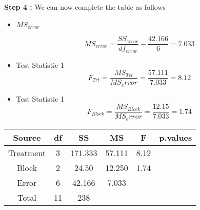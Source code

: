 \documentclass[12pt]{article}
\begin{document}
\newpage


\noindent \textbf{Step 4 :} We can now complete the table as follows
\begin{itemize}
	\item $MS_{error}$
	
	\[ MS_{error} = \frac{SS_{error}}{df_{error}} - \frac{42.166}{6} = 7.033\]
	
	\item Test Statistic 1
	\[F_{Trt} = \frac{MS_{Trt}}{ MS_error } = \frac{57.111}{7.033} = 8.12 \]
	
	\item Test Statistic 1
	\[F_{Block} = \frac{MS_{Block}}{ MS_error } = \frac{12.15}{7.033} = 1.74 \]
\end{itemize}

{
	\Large
	\begin{center}
		\begin{tabular}{|c|c|c|c|c|c|}
			\hline Source	       &	df	&	SS	&	MS	&	F	&	p.values	\\ \hline
			Treatment      &	3	&	171.333	&	57.111	&	8.12	&		\\ \hline
			Block	&	2	&	24.50	&	12.250	&	1.74	&		\\ \hline
			Error	&	6	&	42.166	&	7.033	&		&		\\ \hline 
			Total	&	11	&	238	&		&\phantom{spa}		&	\phantom{spa}		\\ \hline 
		\end{tabular}
	\end{center}
}


\newpage
\end{document}
